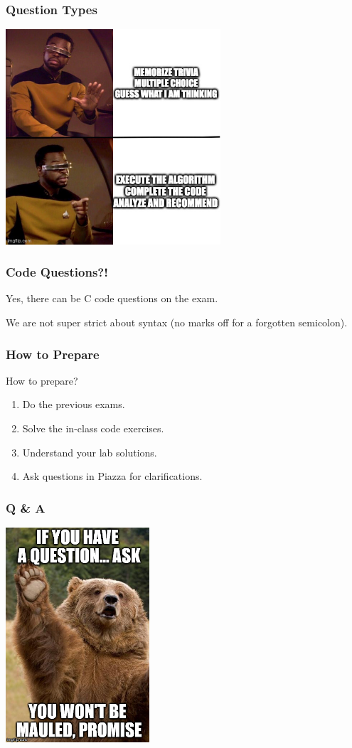 \begin{frame}
\frametitle{Question Types}

\begin{center}
	\includegraphics[width=0.6\textwidth]{images/midterm-questions.jpg}
\end{center}

\end{frame}

\begin{frame}
\frametitle{Code Questions?!}

Yes, there can be C code questions on the exam.

We are not super strict about syntax (no marks off for a forgotten semicolon).


\end{frame}

\begin{frame}
\frametitle{How to Prepare}

How to prepare?

\begin{enumerate}
	\item Do the previous exams.
	\item Solve the in-class code exercises.
	\item Understand your lab solutions.
	\item Ask questions in Piazza for clarifications.
\end{enumerate}

\end{frame}


\begin{frame}
\frametitle{Q \& A}

\begin{center}
	\includegraphics[width=0.4\textwidth]{images/question-bear.jpeg}
\end{center}


\end{frame}






